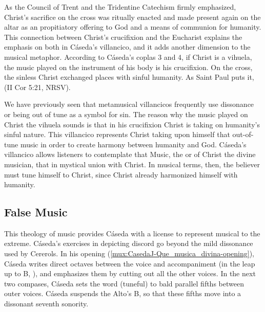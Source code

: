 As the Council of Trent and the Tridentine Catechism firmly emphasized,
Christ's sacrifice on the cross was ritually enacted and made present again on
the altar as an propitiatory offering to God and a means of communion for
humanity. 
This connection between Christ's crucifixion and the Eucharist explains the
emphasis on both in Cáseda's villancico, and it adds another dimension to the
musical metaphor.
According to Cáseda's coplas 3 and 4, if Christ is a vihuela, the music played
on the instrument of his body is his crucifixion.
On the cross, the sinless Christ exchanged places with sinful humanity.
As Saint Paul puts it,  (II Cor 5:21, NRSV).

We have previously seen that metamusical villancicos frequently use dissonance
or being out of tune as a symbol for sin. 
The reason why the music played on Christ the vihuela sounds  is
that in his crucifixion Christ is taking on humanity's sinful nature.
This villancico represents Christ taking upon himself that out-of-tune music in
order to create harmony between humanity and God.
Cáseda's villancico allows listeners to contemplate that Music, the
 or  of Christ the divine
musician, that  in
mystical union with Christ.
In musical terms, then, the believer must tune himself to Christ, since Christ
already harmonized himself with humanity.

\subsection{False Music}

This theology of music provides Cáseda with a license to represent musical
 to the extreme.
Cáseda's exercises in depicting discord go beyond the mild dissonance used by
Cererols.
In his opening (\cref{mux:CasedaJ-Que_musica_divina-opening}), Cáseda writes
direct octaves between the voice and accompaniment (in the leap up to B\fl,
), and emphasizes them by cutting out all the other voices.
In the next two compases, Cáseda sets the word  (tuneful) to
bald parallel fifths between outer voices.
Cáseda suspends the Alto's B\fl, so that these fifths move into a dissonant
seventh sonority.


